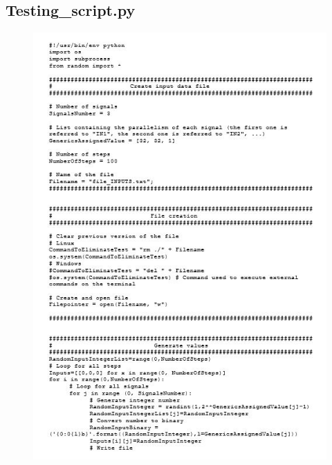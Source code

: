 \subsection{Testing\_script.py}
\begin{figure}[!htb]
	\centering
	\includegraphics[scale=1]{immagini/testing1}
	\label{testing1}
\end{figure}
